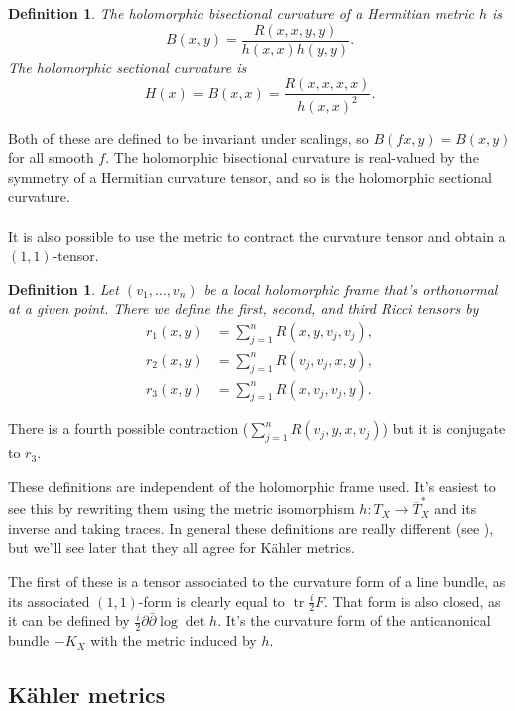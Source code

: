 \documentclass[10pt,a4paper]{article}
\newtheorem{defi}[theo]{Definition}
\DeclareMathOperator{\tr}{tr}
\begin{document}
\begin{defi}
  The \emph{holomorphic bisectional curvature} of a Hermitian metric $h$ is
$$
B(x,y) = \frac{R(x,x,y,y)}{h(x,x)h(y,y)}.
$$
The \emph{holomorphic sectional curvature} is
$$
H(x) = B(x,x) = \frac{R(x,x,x,x)}{h(x,x)^2}.
$$
\end{defi}

Both of these are defined to be invariant under scalings, so $B(fx,y) = B(x,y)$ for all smooth $f$. The holomorphic bisectional curvature is real-valued by the symmetry of a Hermitian curvature tensor, and so is the holomorphic sectional curvature.


\paragraph{}
It is also possible to use the metric to contract the curvature tensor and obtain a $(1,1)$-tensor.

\begin{defi}
  Let $(v_1, \ldots, v_n)$ be a local holomorphic frame that's orthonormal at a given point. There we define the \emph{first}, \emph{second}, and \emph{third Ricci tensors} by
\begin{align*}
r_1(x,y) &= \sum_{j=1}^n R(x,y,v_j,v_j),
\\
r_2(x,y) &= \sum_{j=1}^n R(v_j, v_j, x,y),
\\
r_3(x,y) &= \sum_{j=1}^n R(x,v_j,v_j,y).
\end{align*}
\end{defi}

There is a fourth possible contraction ($\sum_{j=1}^n R(v_j,y,x,v_j)$) but it is conjugate to $r_3$.

These definitions are independent of the holomorphic frame used. It's easiest to see this by rewriting them using the metric isomorphism $h : T_X \to \overline T_X^*$ and its inverse and taking traces. In general these definitions are really different (see ), but we'll see later that they all agree for K\"ahler metrics.

The first of these is a tensor associated to the curvature form of a line bundle, as its associated $(1,1)$-form is clearly equal to $\tr \frac i2 F$. That form is also closed, as it can be defined by $\frac i2 \partial\bar\partial \log \det h$. It's the curvature form of the anticanonical bundle $-K_X$ with the metric induced by $h$.




\subsection{K\"ahler metrics}
\end{document}
